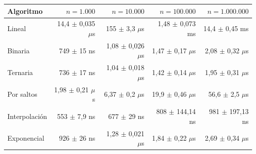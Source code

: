 {\scriptsize
\begin{tabular}{lrrrr}
\toprule
Algoritmo & $n=1.000$ & $n=10.000$ & $n=100.000$ & $n=1.000.000$ \\
\midrule
Lineal & 14,4 $\pm$ 0,035 $\mu$s & 155 $\pm$ 3,3 $\mu$s & 1,48 $\pm$ 0,073 ms & 14,4 $\pm$ 0,45 ms \\
Binaria & 749 $\pm$ 15 ns & 1,08 $\pm$ 0,026 $\mu$s & 1,47 $\pm$ 0,17 $\mu$s & 2,08 $\pm$ 0,32 $\mu$s \\
Ternaria & 736 $\pm$ 17 ns & 1,04 $\pm$ 0,018 $\mu$s & 1,42 $\pm$ 0,14 $\mu$s & 1,95 $\pm$ 0,31 $\mu$s \\
Por saltos & 1,98 $\pm$ 0,21 $\mu$s & 6,37 $\pm$ 0,2 $\mu$s & 19,9 $\pm$ 0,46 $\mu$s & 56,6 $\pm$ 2,5 $\mu$s \\
Interpolaci\'on & 553 $\pm$ 7,9 ns & 677 $\pm$ 29 ns & 808 $\pm$ 144,14 ns & 981 $\pm$ 197,13 ns \\
Exponencial & 926 $\pm$ 26 ns & 1,28 $\pm$ 0,021 $\mu$s & 1,84 $\pm$ 0,22 $\mu$s & 2,69 $\pm$ 0,34 $\mu$s \\
\bottomrule
\end{tabular}}\par
